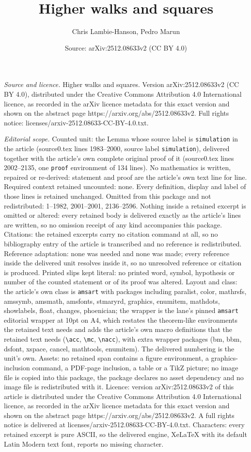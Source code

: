 \documentclass[10pt,a4paper]{amsart}
\title[Higher walks and squares]{Higher walks and squares}
\author{Chris Lambie-Hanson, Pedro Marun}
\date{Source: arXiv:2512.08633v2 (CC BY 4.0)}
\begin{document}
\maketitle

\noindent\emph{Source and licence.} Higher walks and squares. Version arXiv:2512.08633v2 (CC BY 4.0), distributed under the Creative Commons Attribution 4.0 International licence, as recorded in the arXiv licence metadata for this exact version and shown on the abstract page https://arxiv.org/abs/2512.08633v2. Full rights notice: licenses/arxiv-2512.08633-CC-BY-4.0.txt.\par\smallskip

\noindent\textit{Editorial scope.} Counted unit: the Lemma whose source label is \texttt{simulation} in the article (source0.tex lines 1983--2000, source label \texttt{simulation}), delivered together with the article's own complete original proof of it (source0.tex lines 2002--2135, one \texttt{proof} environment of 134 lines). No mathematics is written, repaired or re-derived: statement and proof are the article's own text line for line. Required context retained uncounted: none. Every definition, display and label of those lines is retained unchanged. Omitted from this package and not redistributed: 1--1982, 2001--2001, 2136--2596. Nothing inside a retained excerpt is omitted or altered: every retained body is delivered exactly as the article's lines are written, so no omission receipt of any kind accompanies this package. Citations: the retained excerpts carry no citation command at all, so no bibliography entry of the article is transcribed and no reference is redistributed. Reference adaptation: none was needed and none was made; every reference inside the delivered unit resolves inside it, so no unresolved reference or citation is produced. Printed slips kept literal: no printed word, symbol, hypothesis or number of the counted statement or of its proof was altered. Layout and class: the article's own class is \texttt{amsart} with packages including paralist, color, mathrsfs, amssymb, amsmath, amsfonts, stmaryrd, graphics, enumitem, mathdots, showlabels, float, changes, phoenician; the wrapper is the lane's pinned \texttt{amsart} editorial wrapper at 10pt on A4, which restates the theorem-like environments the retained text needs and adds the article's own macro definitions that the retained text needs (\texttt{\textbackslash acc}, \texttt{\textbackslash mc}, \texttt{\textbackslash nacc}), with extra wrapper packages (bm, bbm, dsfont, xspace, cancel, mathtools, enumitem). The delivered numbering is the unit's own. Assets: no retained span contains a figure environment, a graphics-inclusion command, a PDF-page inclusion, a table or a TikZ picture; no image file is copied into this package, the package declares no asset dependency and no image file is redistributed with it. Licence: version arXiv:2512.08633v2 of this article is distributed under the Creative Commons Attribution 4.0 International licence, as recorded in the arXiv licence metadata for this exact version and shown on the abstract page https://arxiv.org/abs/2512.08633v2. A full rights notice is delivered at licenses/arxiv-2512.08633-CC-BY-4.0.txt. Characters: every retained excerpt is pure ASCII, so the delivered engine, XeLaTeX with its default Latin Modern text font, reports no missing character.
\end{document}
